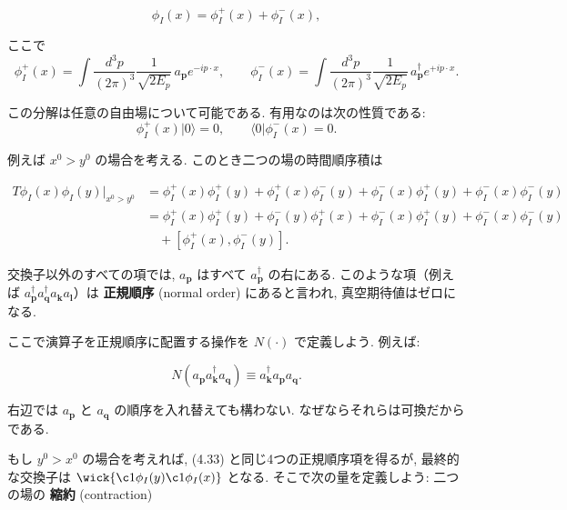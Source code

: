 \documentclass[a4paper,12pt]{article}
\begin{document}
\begin{equation*}
\phi_I(x) = \phi_I^+(x) + \phi_I^-(x),
\tag{4.32}
\end{equation*}

ここで
\begin{equation*}
\phi_I^+(x) = \int \frac{d^3p}{(2\pi)^3} \frac{1}{\sqrt{2E_p}} \, a_{\mathbf{p}} e^{-ip\cdot x}, 
\qquad 
\phi_I^-(x) = \int \frac{d^3p}{(2\pi)^3} \frac{1}{\sqrt{2E_p}} \, a^\dagger_{\mathbf{p}} e^{+ip\cdot x}.
\end{equation*}

この分解は任意の自由場について可能である.  
有用なのは次の性質である:
\begin{equation*}
\phi_I^+(x)|0\rangle = 0, 
\qquad 
\langle 0|\phi_I^-(x) = 0.
\end{equation*}

例えば $x^0 > y^0$ の場合を考える. このとき二つの場の時間順序積は

\begin{align*}
T\phi_I(x)\phi_I(y) \bigg|_{x^0 > y^0} 
&= \phi_I^+(x)\phi_I^+(y) + \phi_I^+(x)\phi_I^-(y) 
+ \phi_I^-(x)\phi_I^+(y) + \phi_I^-(x)\phi_I^-(y) \\
&= \phi_I^+(x)\phi_I^+(y) + \phi_I^-(y)\phi_I^+(x) 
+ \phi_I^-(x)\phi_I^+(y) + \phi_I^-(x)\phi_I^-(y) \\
&\quad + [\phi_I^+(x),\phi_I^-(y)] .
\tag{4.33}
\end{align*}

交換子以外のすべての項では, $a_{\mathbf{p}}$ はすべて $a^\dagger_{\mathbf{p}}$ の右にある.  
このような項（例えば $a^\dagger_{\mathbf{p}} a^\dagger_{\mathbf{q}} a_{\mathbf{k}} a_{\mathbf{l}}$）は 
\textbf{正規順序} (normal order) にあると言われ, 真空期待値はゼロになる.  

ここで演算子を正規順序に配置する操作を $N(\cdot)$ で定義しよう. 例えば:

\begin{equation*}
N(a_{\mathbf{p}} a^\dagger_{\mathbf{k}} a_{\mathbf{q}}) \equiv a^\dagger_{\mathbf{k}} a_{\mathbf{p}} a_{\mathbf{q}} .
\tag{4.34}
\end{equation*}

右辺では $a_{\mathbf{p}}$ と $a_{\mathbf{q}}$ の順序を入れ替えても構わない.  
なぜならそれらは可換だからである.

もし $y^0 > x^0$ の場合を考えれば, (4.33) と同じ4つの正規順序項を得るが, 
最終的な交換子は $\wick{\c1\phi_I(y)\c1\phi_I(x)}$ となる.  
そこで次の量を定義しよう: 二つの場の \textbf{縮約} (contraction)
\end{document}
